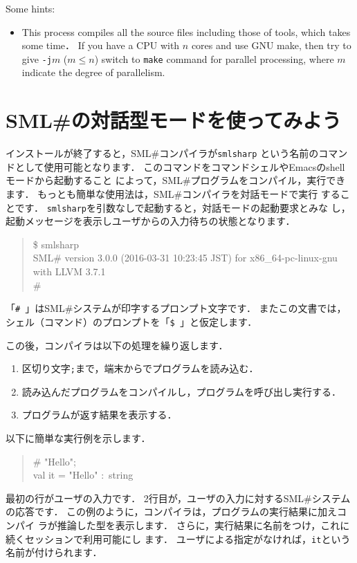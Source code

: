 \documentclass{jbook}
\newif\ifjp
\newcommand{\txt}[2]{#1}
\newcommand{\smlsharp}{SML\#}
\newcommand{\version}{3.0.0}
\newcommand{\releaseDate}{2016-03-31 10:23:45 JST}
\begin{document}
Some hints:
\begin{itemize}
\item 
	This process compiles all the source files including those of
tools, which takes some time．
	If you have a CPU with $n$ cores and use GNU make, then try to
give {\tt -j$m$} ($m \le n$) switch to {\tt make} command for
parallel processing, where $m$ indicate the degree of parallelism. 
\end{itemize}
\fi%

\section{
\txt{\smlsharp{}の対話型モードを使ってみよう}
    {Let's try \smlsharp{} interactive mode}}
\label{sec:tutorialInteractive}

\ifjp%

	インストールが終了すると，\smlsharp{}コンパイラが{\tt smlsharp}
という名前のコマンドとして使用可能となります．
	このコマンドをコマンドシェルやEmacsのshellモードから起動すること
によって，\smlsharp{}プログラムをコンパイル，実行できます．
	もっとも簡単な使用法は，\smlsharp{}コンパイラを対話モードで実行
することです．
	{\tt smlsharp}を引数なしで起動すると，対話モードの起動要求とみな
し，起動メッセージを表示しユーザからの入力待ちの状態となります．
\begin{tt}
\begin{quote}
\$ smlsharp\\
SML\# version \version{} (\releaseDate{}) for x86\_64-pc-linux-gnu with LLVM 3.7.1\\
\# 
\end{quote}
\end{tt}
	「{\tt \#\ }」は\smlsharp{}システムが印字するプロンプト文字です． 
	またこの文書では，シェル（コマンド）のプロンプトを「{\tt \$\ }」と仮定します．

	この後，コンパイラは以下の処理を繰り返します．
\begin{enumerate}
\item 区切り文字{\tt ;}まで，端末からでプログラムを読み込む．
\item 読み込んだプログラムをコンパイルし，プログラムを呼び出し実行する．
\item プログラムが返す結果を表示する．
\end{enumerate}
	以下に簡単な実行例を示します．
\begin{tt}
\begin{quote}
\# "Hello";\\
val it = "Hello" :~string
\end{quote}
\end{tt}
	最初の行がユーザの入力です．
	2行目が，ユーザの入力に対する\smlsharp{}システムの応答です．
	この例のように，コンパイラは，プログラムの実行結果に加えコンパイ
ラが推論した型を表示します．
	さらに，実行結果に名前をつけ，これに続くセッションで利用可能にし
ます．
	ユーザによる指定がなければ，{\tt it}という名前が付けられます．
\else%
\end{document}
